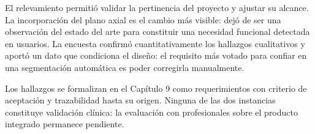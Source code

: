 El relevamiento permitió validar la pertinencia del proyecto y ajustar su alcance. La incorporación del plano axial es el cambio más visible: dejó de ser una observación del estado del arte para constituir una necesidad funcional detectada en usuarios. La encuesta confirmó cuantitativamente los hallazgos cualitativos y aportó un dato que condiciona el diseño: el requisito más votado para confiar en una segmentación automática es poder corregirla manualmente.

Los hallazgos se formalizan en el Capítulo 9 como requerimientos con criterio de aceptación y trazabilidad hasta su origen. Ninguna de las dos instancias constituye validación clínica: la evaluación con profesionales sobre el producto integrado permanece pendiente.
